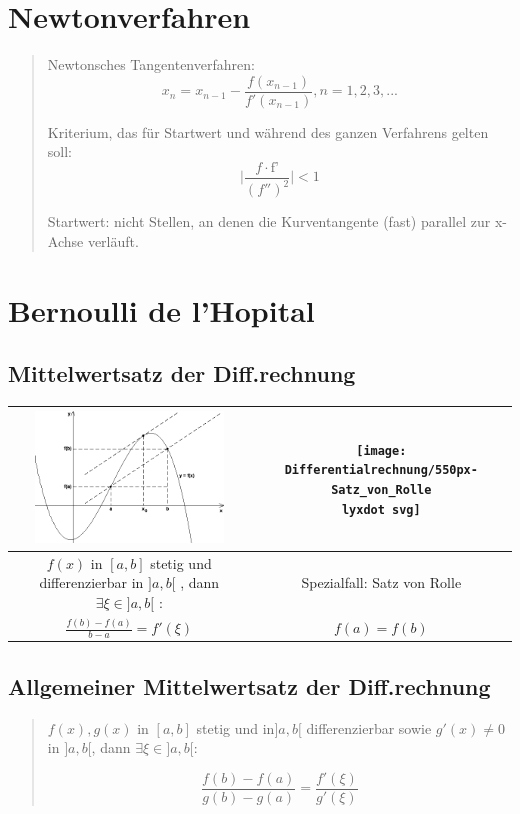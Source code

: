 \section*{Newtonverfahren}
\begin{quote}
Newtonsches Tangentenverfahren:
\[
x_{n}=x_{n-1}-\frac{f(x_{n-1})}{f'(x_{n-1})},n=1,2,3,...
\]


Kriterium, das für Startwert und während des ganzen Verfahrens gelten
soll:
\[
\mid\frac{f\cdot\text{f'}}{(f'')^{2}}\mid<1
\]


Startwert: nicht Stellen, an denen die Kurventangente (fast) parallel
zur x-Achse verläuft.
\end{quote}

\section*{Bernoulli de l'Hopital}


\subsection*{Mittelwertsatz der Diff.rechnung}

\begin{tabular}{|c|c|}
\hline 
\includegraphics[width=5cm]{Differentialrechnung/MittelwertsatzD} & \texttt{[image: Differentialrechnung/550px-Satz\_von\_Rolle\\lyxdot svg]}\tabularnewline
\hline 
\hline 
$f(x)$ in $[a,b]$ stetig und differenzierbar in $]a,b[$ , dann
$\exists\xi\in]a,b[$ : & Spezialfall: Satz von Rolle \tabularnewline
\hline 
$\frac{f(b)-f(a)}{b-a}=f'(\xi)$ & $f(a)=f(b)$\tabularnewline
\hline 
\end{tabular}


\subsection*{Allgemeiner Mittelwertsatz der Diff.rechnung}
\begin{quote}
$f(x),g(x)$ in $[a,b]$ stetig und in$]a,b[$ differenzierbar sowie
$g'(x)\neq0$ in $]a,b[$, dann $\exists\xi\in]a,b[$:

\[
\frac{f(b)-f(a)}{g(b)-g(a)}=\frac{f'(\xi)}{g'(\xi)}
\]

\end{quote}

